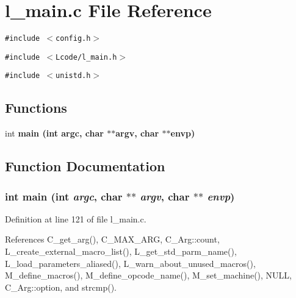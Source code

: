 \section{l\_\-main.c File Reference}
\label{l__main_8c}
{\tt \#include $<$config.h$>$}\par
{\tt \#include $<$Lcode/l\_\-main.h$>$}\par
{\tt \#include $<$unistd.h$>$}\par
\subsection*{Functions}
\begin{CompactItemize}
\item 
int \bf{main} (int argc, char $\ast$$\ast$argv, char $\ast$$\ast$envp)
\end{CompactItemize}


\subsection{Function Documentation}
\subsubsection{\setlength{\rightskip}{0pt plus 5cm}int main (int {\em argc}, char $\ast$$\ast$ {\em argv}, char $\ast$$\ast$ {\em envp})}\label{l__main_8c_647f21a28344e1d9c643f4115516d7c9}




Definition at line 121 of file l\_\-main.c.

References C\_\-get\_\-arg(), C\_\-MAX\_\-ARG, C\_\-Arg::count, L\_\-create\_\-external\_\-macro\_\-list(), L\_\-get\_\-std\_\-parm\_\-name(), L\_\-load\_\-parameters\_\-aliased(), L\_\-warn\_\-about\_\-unused\_\-macros(), M\_\-define\_\-macros(), M\_\-define\_\-opcode\_\-name(), M\_\-set\_\-machine(), NULL, C\_\-Arg::option, and strcmp().